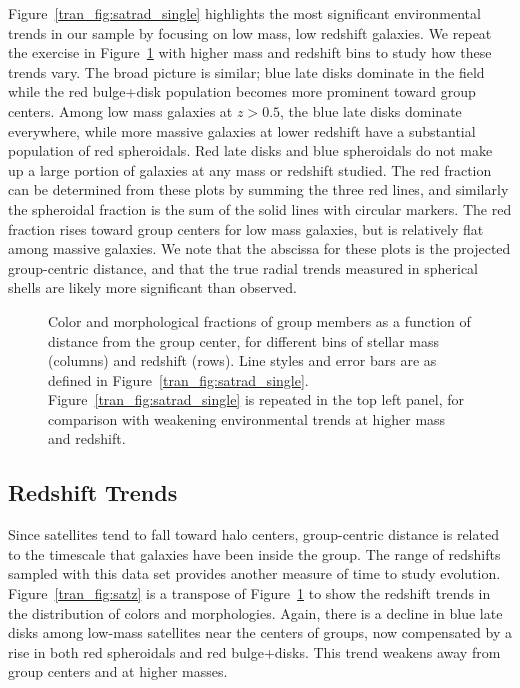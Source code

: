 Figure~\ref{tran_fig:satrad_single} highlights the most significant
environmental trends in our sample by focusing on low mass, low
redshift galaxies. We repeat the exercise in Figure~\ref{tran_fig:satrad}
with higher mass and redshift bins to study how these trends vary. The
broad picture is similar; blue late disks dominate in the field while
the red bulge+disk population becomes more prominent toward group
centers. Among low mass galaxies at $z>0.5$, the blue late disks
dominate everywhere, while more massive galaxies at lower redshift
have a substantial population of red spheroidals. Red late disks and
blue spheroidals do not make up a large portion of galaxies at
any mass or redshift studied. The red fraction can be determined from these plots by
  summing the three red lines, and similarly the spheroidal fraction
  is the sum of the solid lines with circular markers. The red
  fraction rises toward group centers for low mass galaxies, but is
  relatively flat among massive galaxies. We note that the abscissa for these plots is
the projected group-centric distance, and that the true radial trends measured
in spherical shells are likely more significant than observed.


\begin{figure}[htb]
\caption{Color and morphological fractions of group members as a
  function of distance from the group center, for different bins of
  stellar mass (columns) and redshift (rows). Line styles and error
  bars are as defined in
  Figure~\ref{tran_fig:satrad_single}. Figure~\ref{tran_fig:satrad_single} is
  repeated in the top left panel, for comparison with weakening
  environmental trends at higher mass and redshift.}
\label{tran_fig:satrad}
\end{figure}

\subsection{Redshift Trends}
\label{tran_s:ztrends}

Since satellites tend to fall toward halo centers, group-centric
distance is related to the timescale that galaxies have been inside
the group. The range of redshifts sampled with this data set provides
another measure of time to study evolution. Figure~\ref{tran_fig:satz} is a
transpose of Figure~\ref{tran_fig:satrad} to show the redshift trends in
the distribution of colors and morphologies. Again, there is a decline
in blue late disks among low-mass satellites near the centers of
groups, now compensated by a rise in both red spheroidals and red
bulge+disks. This trend weakens away from group centers and at
higher masses.

